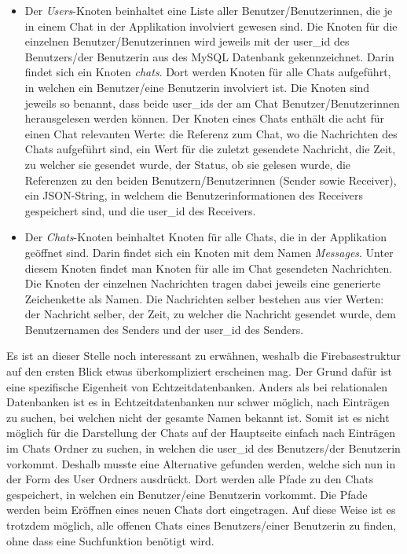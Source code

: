 \documentclass[../main.tex]{subfiles}
\begin{document}
	\begin{itemize}
		\item Der \emph{Users}-Knoten beinhaltet eine Liste aller Benutzer/Benutzerinnen, die je in einem Chat in der Applikation involviert gewesen sind. Die Knoten für die einzelnen Benutzer/Benutzerinnen wird jeweils mit der user\_id des Benutzers/der Benutzerin aus des MySQL Datenbank gekennzeichnet. Darin findet sich ein Knoten \emph{chats}. Dort werden Knoten für alle Chats aufgeführt, in welchen ein Benutzer/eine Benutzerin involviert ist. Die Knoten sind jeweils so benannt, dass beide user\_ids der am Chat Benutzer/Benutzerinnen herausgelesen werden können. Der Knoten eines Chats enthält die acht für einen Chat relevanten Werte: die Referenz zum Chat, wo die Nachrichten des Chats aufgeführt sind, ein Wert für die zuletzt gesendete Nachricht, die Zeit, zu welcher sie gesendet wurde, der Status, ob sie gelesen wurde,  die Referenzen zu den beiden Benutzern/Benutzerinnen (Sender sowie Receiver), ein JSON-String, in welchem die Benutzerinformationen des Receivers gespeichert sind, und die user\_id des Receivers.
		\item  Der \emph{Chats}-Knoten beinhaltet Knoten für alle Chats, die in der Applikation geöffnet sind. Darin findet sich ein Knoten mit dem Namen \emph{Messages}. Unter diesem Knoten findet man Knoten für alle im Chat gesendeten Nachrichten. Die Knoten der einzelnen Nachrichten tragen dabei jeweils eine generierte Zeichenkette als Namen. Die Nachrichten selber bestehen aus vier Werten: der Nachricht selber, der Zeit, zu welcher die Nachricht gesendet wurde, dem Benutzernamen des Senders und der user\_id des Senders.
	\end{itemize}

	Es ist an dieser Stelle noch interessant zu erwähnen, weshalb die Firebasestruktur auf den ersten Blick etwas überkompliziert erscheinen mag. Der Grund dafür ist eine spezifische Eigenheit von Echtzeitdatenbanken. Anders als bei relationalen Datenbanken ist es in Echtzeitdatenbanken nur schwer möglich, nach Einträgen zu suchen, bei welchen nicht der gesamte Namen bekannt ist. Somit ist es nicht möglich für die Darstellung der Chats auf der Hauptseite einfach nach Einträgen im Chats Ordner zu suchen, in welchen die user\_id des Benutzers/der Benutzerin vorkommt. Deshalb musste eine Alternative gefunden werden, welche sich nun in der Form des User Ordners ausdrückt. Dort werden alle Pfade zu den Chats gespeichert, in welchen ein Benutzer/eine Benutzerin vorkommt. Die Pfade werden beim Eröffnen eines neuen Chats dort eingetragen. Auf diese Weise ist es trotzdem möglich, alle offenen Chats eines Benutzers/einer Benutzerin zu finden, ohne dass eine Suchfunktion benötigt wird.
	
\end{document}
